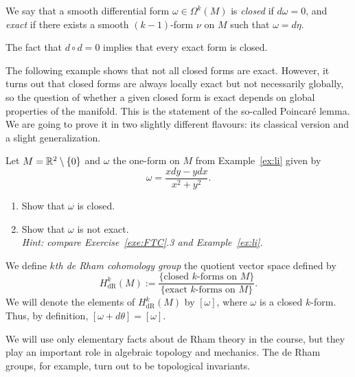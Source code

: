 \begin{definition}
We say that a smooth differential form $\omega\in\Omega^k(M)$ is \emph{closed} if $d\omega = 0$, and \emph{exact} if there exists a smooth $(k-1)$-form $\nu$ on $M$ such that $\omega = d\eta$.

The fact that $d\circ d = 0$ implies that every exact form is closed.
\end{definition}

The following example shows that not all closed forms are exact.
However, it turns out that closed forms are always locally exact but not necessarily globally, so the question of whether a given closed form is exact depends on global properties of the manifold.
This is the statement of the so-called Poincar\'e lemma.
We are going to prove it in two slightly different flavours: its classical version and a slight generalization.

\begin{exercise}
  Let $M=\mathbb{R}^2\setminus\{0\}$ and $\omega$ the one-form on $M$ from Example~\ref{ex:li} given by
  \begin{equation}
    \omega = \frac{xdy - ydx}{x^2+y^2}.
  \end{equation}
  \begin{enumerate}
    \item Show that $\omega$ is closed.
    \item Show that $\omega$ is not exact.\\
    \textit{\small Hint: compare Exercise~\ref{exe:FTC}.3 and Example~\ref{ex:li}.}
  \end{enumerate}
\end{exercise}

\begin{definition}
We define \emph{$k$th de Rham cohomology group} the quotient vector space defined by
\begin{equation}
  H_{\mathrm{dR}}^k(M) := \frac{\{\mbox{closed $k$-forms on $M$}\}}{\{\mbox{exact $k$-forms on $M$}\}}.
\end{equation}
We will denote the elements of $H_{\mathrm{dR}}^k(M)$ by $[\omega]$, where $\omega$ is a closed $k$-form. Thus, by definition, $[\omega + d\theta] = [\omega]$.
\end{definition}

We will use only elementary facts about de Rham theory in the course, but they play an important role in algebraic topology and mechanics.
The de Rham groups, for example, turn out to be topological invariants.

